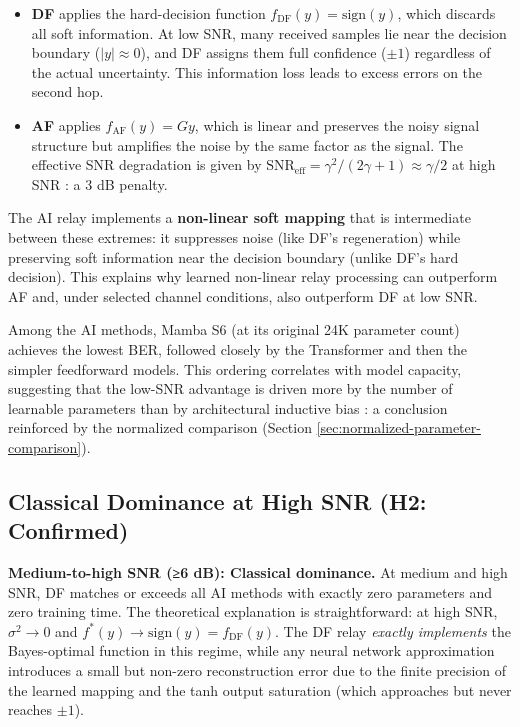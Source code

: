 \begin{itemize}
\item
  \textbf{DF} applies the hard-decision function \(f_{\text{DF}}(y) = \text{sign}(y)\), which discards all soft information. At low SNR, many received samples lie near the decision boundary (\(|y| \approx 0\)), and DF assigns them full confidence (\(\pm 1\)) regardless of the actual uncertainty. This information loss leads to excess errors on the second hop.
\item
  \textbf{AF} applies \(f_{\text{AF}}(y) = Gy\), which is linear and preserves the noisy signal structure but amplifies the noise by the same factor as the signal. The effective SNR degradation is given by \(\text{SNR}_{\text{eff}} = \gamma^2 / (2\gamma + 1) \approx \gamma/2\) at high SNR : a 3 dB penalty.
\end{itemize}

The AI relay implements a \textbf{non-linear soft mapping} that is intermediate between these extremes: it suppresses noise (like DF's regeneration) while preserving soft information near the decision boundary (unlike DF's hard decision). This explains why learned non-linear relay processing can outperform AF and, under selected channel conditions, also outperform DF at low SNR.

Among the AI methods, Mamba S6 (at its original 24K parameter count) achieves the lowest BER, followed closely by the Transformer and then the simpler feedforward models. This ordering correlates with model capacity, suggesting that the low-SNR advantage is driven more by the number of learnable parameters than by architectural inductive bias : a conclusion reinforced by the normalized comparison (Section \ref{sec:normalized-parameter-comparison}).

\subsection{Classical Dominance at High SNR (H2: Confirmed)}\label{sec:classical-dominance-at-high-snr-h2-confirmed}

\textbf{Medium-to-high SNR (≥6 dB): Classical dominance.} At medium and high SNR, DF matches or exceeds all AI methods with exactly zero parameters and zero training time. The theoretical explanation is straightforward: at high SNR, \(\sigma^2 \to 0\) and \(f^*(y) \to \text{sign}(y) = f_{\text{DF}}(y)\). The DF relay \emph{exactly implements} the Bayes-optimal function in this regime, while any neural network approximation introduces a small but non-zero reconstruction error due to the finite precision of the learned mapping and the tanh output saturation (which approaches but never reaches \(\pm 1\)).

